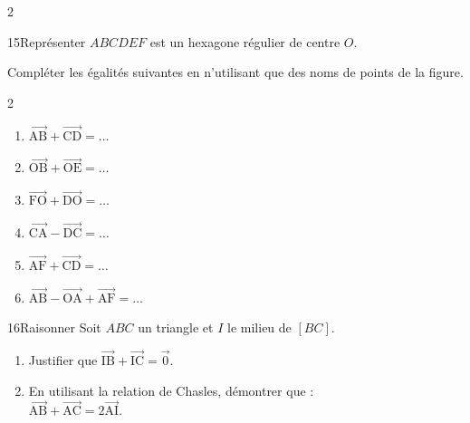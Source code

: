 \documentclass[10pt,a4paper]{article}
\newcommand{\starfull}[1]{{\color{#1}\ding{72}}}
\newcommand{\starempty}{{\color{gray!45}\ding{73}}}
\newcommand{\Vj}[1]{\overrightarrow{\text{#1}}}
\newcommand{\Pt}[1]{\textsf{\footnotesize #1}}
\begin{document}
\begin{multicols}{2}
\begin{Exo}{15}{\starfull{diffblue}\starfull{diffblue}\starempty}{Repr\'esenter}
$ABCDEF$ est un hexagone r\'egulier de centre $O$.
\begin{center}
\end{center}
Compl\'eter les \'egalit\'es suivantes en n'utilisant que des noms de points de la figure.
\begin{multicols}{2}
\begin{enumerate}
\item $\Vj{AB}+\Vj{CD}=\dots$
\item $\Vj{OB}+\Vj{OE}=\dots$
\item $\Vj{FO}+\Vj{DO}=\dots$
\item $\Vj{CA}-\Vj{DC}=\dots$
\item $\Vj{AF}+\Vj{CD}=\dots$
\item $\Vj{AB}-\Vj{OA}+\Vj{AF}=\dots$
\end{enumerate}
\end{multicols}
\vspace{1pt}
\end{Exo}

\begin{Exo}{16}{\starfull{diffblue}\starfull{diffblue}\starempty}{Raisonner}
Soit $ABC$ un triangle et $I$ le milieu de $[BC]$.
\begin{enumerate}
\item Justifier que $\Vj{IB}+\Vj{IC}=\vec 0$.
\item En utilisant la relation de Chasles, d\'emontrer que : \\ $\Vj{AB}+\Vj{AC}=2\Vj{AI}$.
\end{enumerate}
\end{Exo}


\end{multicols}
\end{document}

